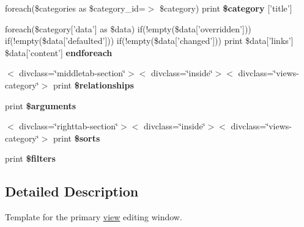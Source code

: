 \begin{CompactItemize}
\item 
\hypertarget{views-ui-edit-tab_8tpl_8php_cb034b20b384dd4a3c80d5dd2352c00b}{
foreach(\$categories as \$category\_\-id=$>$ \$category) print \textbf{\$category} \mbox{[}'title'\mbox{]}}
\label{views-ui-edit-tab_8tpl_8php_cb034b20b384dd4a3c80d5dd2352c00b}

\item 
\hypertarget{views-ui-edit-tab_8tpl_8php_672d9707ef91db026c210f98cc601123}{
foreach(\$category\mbox{[}'data'\mbox{]} as \$data) if(!empty(\$data\mbox{[}'overridden'\mbox{]})) if(!empty(\$data\mbox{[}'defaulted'\mbox{]})) if(!empty(\$data\mbox{[}'changed'\mbox{]})) print \$data\mbox{[}'links'\mbox{]} \$data\mbox{[}'content'\mbox{]} \textbf{endforeach}}
\label{views-ui-edit-tab_8tpl_8php_672d9707ef91db026c210f98cc601123}

\item 
\hypertarget{views-ui-edit-tab_8tpl_8php_f9d5a3fd50f4e0fee86106ca9d287dc8}{
$<$ divclass=\char`\"{}middletab-section\char`\"{}$>$$<$ divclass=\char`\"{}inside\char`\"{}$>$$<$ divclass=\char`\"{}views-category\char`\"{}$>$ print \textbf{\$relationships}}
\label{views-ui-edit-tab_8tpl_8php_f9d5a3fd50f4e0fee86106ca9d287dc8}

\item 
\hypertarget{views-ui-edit-tab_8tpl_8php_90dd5cf4537202eec0a4b73aed12035b}{
print \textbf{\$arguments}}
\label{views-ui-edit-tab_8tpl_8php_90dd5cf4537202eec0a4b73aed12035b}

\item 
\hypertarget{views-ui-edit-tab_8tpl_8php_c4219867966e2af2c532513197f9e36f}{
$<$ divclass=\char`\"{}righttab-section\char`\"{}$>$$<$ divclass=\char`\"{}inside\char`\"{}$>$$<$ divclass=\char`\"{}views-category\char`\"{}$>$ print \textbf{\$sorts}}
\label{views-ui-edit-tab_8tpl_8php_c4219867966e2af2c532513197f9e36f}

\item 
\hypertarget{views-ui-edit-tab_8tpl_8php_467d41e2242c36599dae09a629633ad5}{
print \textbf{\$filters}}
\label{views-ui-edit-tab_8tpl_8php_467d41e2242c36599dae09a629633ad5}

\end{CompactItemize}


\subsection{Detailed Description}
Template for the primary \hyperlink{classview}{view} editing window. 
